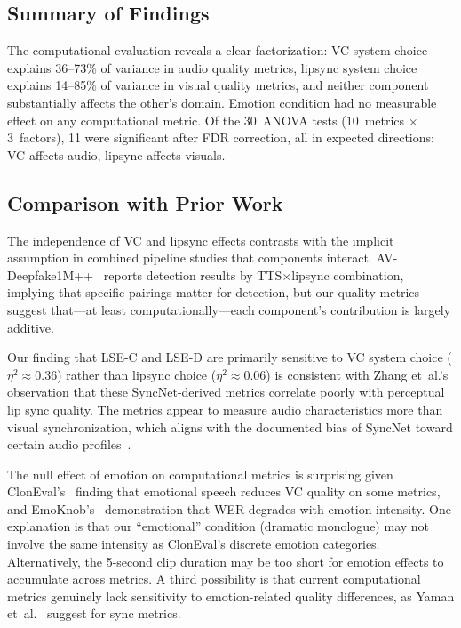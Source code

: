 \documentclass[11pt,a4paper]{article}
\begin{document}
\subsection{Summary of Findings}

The computational evaluation reveals a clear factorization: VC system choice explains 36--73\% of variance in audio quality metrics, lipsync system choice explains 14--85\% of variance in visual quality metrics, and neither component substantially affects the other's domain.
Emotion condition had no measurable effect on any computational metric.
Of the 30~ANOVA tests (10~metrics $\times$ 3~factors), 11 were significant after FDR correction, all in expected directions: VC affects audio, lipsync affects visuals.

\subsection{Comparison with Prior Work}

The independence of VC and lipsync effects contrasts with the implicit assumption in combined pipeline studies that components interact.
AV-Deepfake1M++~\citep{cai2025avdeepfake} reports detection results by TTS$\times$lipsync combination, implying that specific pairings matter for detection, but our quality metrics suggest that---at least computationally---each component's contribution is largely additive.

Our finding that LSE-C and LSE-D are primarily sensitive to VC system choice ($\eta^2 \approx 0.36$) rather than lipsync choice ($\eta^2 \approx 0.06$) is consistent with Zhang et~al.'s~\citep{zhang2024perceptual} observation that these SyncNet-derived metrics correlate poorly with perceptual lip sync quality.
The metrics appear to measure audio characteristics more than visual synchronization, which aligns with the documented bias of SyncNet toward certain audio profiles~\citep{yaman2024stabilized}.

The null effect of emotion on computational metrics is surprising given ClonEval's~\citep{christop2025cloneval} finding that emotional speech reduces VC quality on some metrics, and EmoKnob's~\citep{emoknob2024} demonstration that WER degrades with emotion intensity.
One explanation is that our ``emotional'' condition (dramatic monologue) may not involve the same intensity as ClonEval's discrete emotion categories.
Alternatively, the 5-second clip duration may be too short for emotion effects to accumulate across metrics.
A third possibility is that current computational metrics genuinely lack sensitivity to emotion-related quality differences, as Yaman et~al.~\citep{yaman2024stabilized} suggest for sync metrics.
\end{document}
